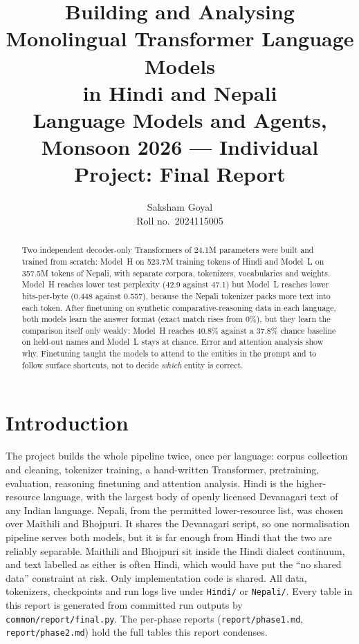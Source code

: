 \documentclass[10pt,a4paper]{article}
\title{\vspace{-1.2cm}\textbf{Building and Analysing Monolingual Transformer Language Models\\in Hindi and Nepali}\\[2pt]
\large Language Models and Agents, Monsoon 2026 --- Individual Project: Final Report}
\author{Saksham Goyal\\\normalsize Roll no.\ 2024115005}
\date{\vspace{-0.6cm}}
\newcommand{\MH}{Model~H}
\newcommand{\ML}{Model~L}
\newcommand{\code}[1]{\texttt{#1}}
\begin{document}
\maketitle

\begin{abstract}
\noindent
Two independent decoder-only Transformers of 24.1M parameters were built and trained from scratch:
\MH{} on 523.7M training tokens of Hindi and \ML{} on 357.5M tokens of Nepali, with separate corpora, tokenizers, vocabularies and weights.
\MH{} reaches lower test perplexity (42.9 against 47.1) but \ML{} reaches lower bits-per-byte (0.448 against 0.557), because the Nepali tokenizer packs more text into each token.
After finetuning on synthetic comparative-reasoning data in each language, both models learn the answer format (exact match rises from 0\%), but they learn the comparison itself only weakly: \MH{} reaches 40.8\% against a 37.8\% chance baseline on held-out names and \ML{} stays at chance.
Error and attention analysis show why. Finetuning taught the models to attend to the entities in the prompt and to follow surface shortcuts, not to decide \emph{which} entity is correct.
\end{abstract}

\section{Introduction}
The project builds the whole pipeline twice, once per language: corpus collection and cleaning, tokenizer training, a hand-written Transformer, pretraining, evaluation, reasoning finetuning and attention analysis.
Hindi is the higher-resource language, with the largest body of openly licensed Devanagari text of any Indian language.
Nepali, from the permitted lower-resource list, was chosen over Maithili and Bhojpuri. It shares the Devanagari script, so one normalisation pipeline serves both models, but it is far enough from Hindi that the two are reliably separable. Maithili and Bhojpuri sit inside the Hindi dialect continuum, and text labelled as either is often Hindi, which would have put the ``no shared data'' constraint at risk.
Only implementation code is shared. All data, tokenizers, checkpoints and run logs live under \code{Hindi/} or \code{Nepali/}.
Every table in this report is generated from committed run outputs by \code{common/report/final.py}.
The per-phase reports (\code{report/phase1.md}, \code{report/phase2.md}) hold the full tables this report condenses.
\end{document}
